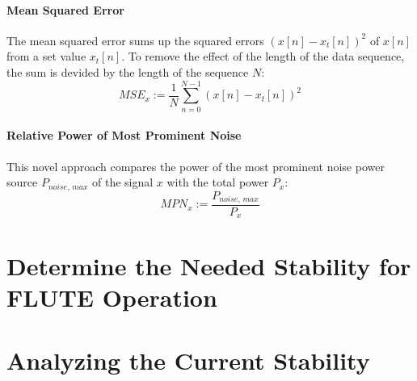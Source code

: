 \paragraph{Mean Squared Error}
The mean squared error sums up the squared errors $\left(x[n] - x_t[n]\right)^2$ of $x[n]$ from a set value $x_t[n]$. To remove the effect of the length of the data sequence, the sum is devided by the length of the sequence $N$:
\begin{equation}
MSE_x := \frac{1}{N} \sum_{n=0}^{N-1} \left(x[n] - x_t[n]\right)^2
\end{equation}

\paragraph{Relative Power of Most Prominent Noise}
This novel approach compares the power of the most prominent noise power source $P_{noise,\,max}$ of the signal $x$ with the total power $P_x$:
\begin{equation}
MPN_x := \frac{P_{noise,\,max}}{P_x}
\end{equation}

\section{Determine the Needed Stability for FLUTE Operation}


\section{Analyzing the Current Stability}


